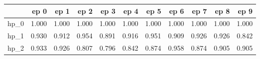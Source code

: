 \begin{tabular}{lrrrrrrrrrr}
\toprule
{} &   ep 0 &   ep 1 &   ep 2 &   ep 3 &   ep 4 &   ep 5 &   ep 6 &   ep 7 &   ep 8 &   ep 9 \\
\midrule
hp\_0 &  1.000 &  1.000 &  1.000 &  1.000 &  1.000 &  1.000 &  1.000 &  1.000 &  1.000 &  1.000 \\
hp\_1 &  0.930 &  0.912 &  0.954 &  0.891 &  0.916 &  0.951 &  0.909 &  0.926 &  0.926 &  0.842 \\
hp\_2 &  0.933 &  0.926 &  0.807 &  0.796 &  0.842 &  0.874 &  0.958 &  0.874 &  0.905 &  0.905 \\
\bottomrule
\end{tabular}
